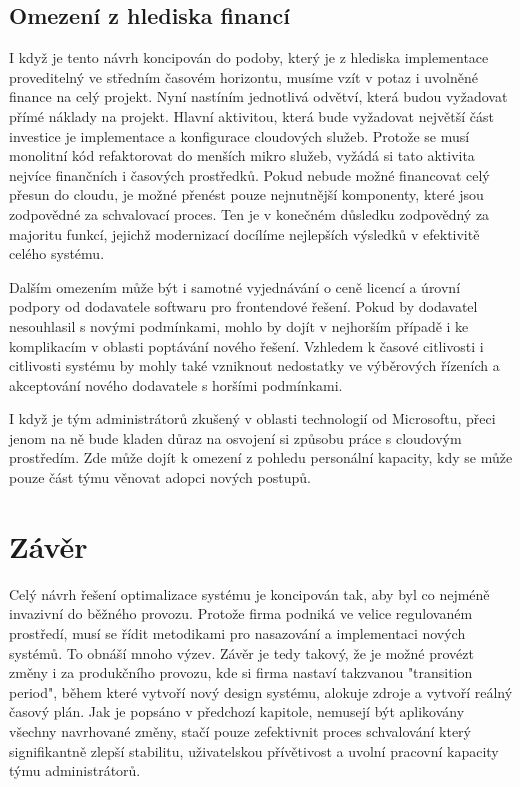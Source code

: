 \documentclass[12pt]{article}
\begin{document}
\begin{sloppypar}
\begin{spacing}{1.15}
        \subsection*{Omezení z hlediska financí}
        I když je tento návrh koncipován do podoby, který je z hlediska
        implementace proveditelný ve středním časovém horizontu, musíme vzít v
        potaz i uvolněné finance na celý projekt. Nyní nastíním jednotlivá
        odvětví, která budou vyžadovat přímé náklady na projekt. Hlavní
        aktivitou, která bude vyžadovat největší část investice je implementace a
        konfigurace cloudových služeb. Protože se musí monolitní kód
        refaktorovat do menších mikro služeb, vyžádá si tato aktivita nejvíce
        finančních i časových prostředků. Pokud nebude možné financovat celý
        přesun do cloudu, je možné přenést pouze nejnutnější komponenty, které
        jsou zodpovědné za schvalovací proces. Ten je v konečném důsledku
        zodpovědný za majoritu funkcí, jejichž modernizací docílíme nejlepších
        výsledků v efektivitě celého systému.

        Dalším omezením může být i samotné vyjednávání o ceně licencí a úrovní 
        podpory od dodavatele softwaru pro frontendové řešení. Pokud by
        dodavatel nesouhlasil s novými podmínkami, mohlo by dojít v nejhorším
        případě i ke komplikacím v oblasti poptávání nového řešení. Vzhledem k
        časové citlivosti i citlivosti systému by mohly také vzniknout
        nedostatky ve výběrových řízeních a akceptování nového dodavatele s
        horšími podmínkami.  
        
        I když je tým administrátorů zkušený v oblasti technologií od Microsoftu,
        přeci jenom na ně bude kladen důraz na osvojení si způsobu práce s
        cloudovým prostředím. Zde může dojít k omezení z pohledu personální
        kapacity, kdy se může pouze část týmu věnovat adopci nových postupů.

        \section*{Závěr}
        Celý návrh řešení optimalizace systému je koncipován tak, aby byl co
        nejméně invazivní do běžného provozu. Protože firma podniká ve velice
        regulovaném prostředí, musí se řídit metodikami pro nasazování a
        implementaci nových systémů. To obnáší mnoho výzev. Závěr je tedy
        takový, že je možné provézt změny i za produkčního provozu, kde si firma
        nastaví takzvanou "transition period", během které vytvoří nový design
        systému, alokuje zdroje a vytvoří reálný časový plán. Jak je popsáno v
        předchozí kapitole, nemusejí být aplikovány všechny navrhované změny,
        stačí pouze zefektivnit proces schvalování který signifikantně zlepší
        stabilitu, uživatelskou přívětivost a uvolní pracovní kapacity týmu
        administrátorů.

	\end{spacing}
    \end{sloppypar}
\end{document}

